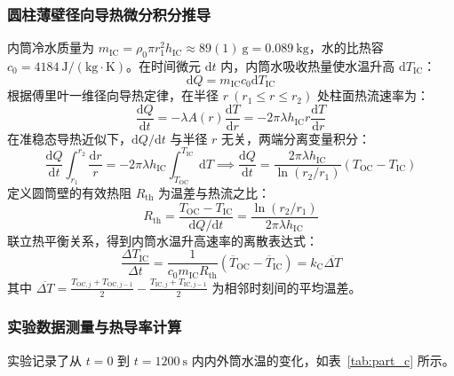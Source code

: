 \documentclass[10pt, a4paper]{ctexart}
\begin{document}
\subsubsection{圆柱薄壁径向导热微分积分推导}
内筒冷水质量为 $m_{\mathrm{IC}} = \rho_0 \pi r_1^2 h_{\mathrm{IC}} \approx 89(1)\ \mathrm{g} = 0.089\ \mathrm{kg}$，水的比热容 $c_0 = 4184\ \mathrm{J/(kg\cdot K)}$。在时间微元 $\mathrm{d}t$ 内，内筒水吸收热量使水温升高 $\mathrm{d}T_{\mathrm{IC}}$：
\begin{equation}
\mathrm{d}Q = m_{\mathrm{IC}} c_0 \mathrm{d}T_{\mathrm{IC}}
\end{equation}
根据傅里叶一维径向导热定律\cite{ref7, ref8}，在半径 $r\ (r_1 \le r \le r_2)$ 处柱面热流速率为：
\begin{equation}
\frac{\mathrm{d}Q}{\mathrm{d}t} = -\lambda A(r) \frac{\mathrm{d}T}{\mathrm{d}r} = -2\pi \lambda h_{\mathrm{IC}} r \frac{\mathrm{d}T}{\mathrm{d}r}
\end{equation}
在准稳态导热近似下，$\mathrm{d}Q/\mathrm{d}t$ 与半径 $r$ 无关，两端分离变量积分：
\begin{equation}
\frac{\mathrm{d}Q}{\mathrm{d}t}\int_{r_1}^{r_2}\frac{\mathrm{d}r}{r} = -2\pi \lambda h_{\mathrm{IC}} \int_{T_{\mathrm{OC}}}^{T_{\mathrm{IC}}}\mathrm{d}T \implies \frac{\mathrm{d}Q}{\mathrm{d}t} = \frac{2\pi \lambda h_{\mathrm{IC}}}{\ln(r_2/r_1)}(T_{\mathrm{OC}} - T_{\mathrm{IC}})
\end{equation}
定义圆筒壁的有效热阻 $R_{\mathrm{th}}$ 为温差与热流之比：
\begin{equation}
R_{\mathrm{th}} = \frac{T_{\mathrm{OC}} - T_{\mathrm{IC}}}{\mathrm{d}Q/\mathrm{d}t} = \frac{\ln(r_2/r_1)}{2\pi \lambda h_{\mathrm{IC}}}
\label{eq:thermal_res}
\end{equation}
联立热平衡关系，得到内筒水温升高速率的离散表达式：
\begin{equation}
\frac{\Delta T_{\mathrm{IC}}}{\Delta t} = \frac{1}{c_0 m_{\mathrm{IC}} R_{\mathrm{th}}}\left(\overline{T}_{\mathrm{OC}} - \overline{T}_{\mathrm{IC}}\right) = k_{\mathrm{C}} \overline{\Delta T}
\label{eq:fourier_discrete}
\end{equation}
其中 $\overline{\Delta T} = \frac{T_{\mathrm{OC},j}+T_{\mathrm{OC},j-1}}{2} - \frac{T_{\mathrm{IC},j}+T_{\mathrm{IC},j-1}}{2}$ 为相邻时刻间的平均温差。

\subsubsection{实验数据测量与热导率计算}
实验记录了从 $t = 0$ 到 $t = 1200\ \mathrm{s}$ 内内外筒水温的变化，如表~\ref{tab:part_c} 所示。
\end{document}
